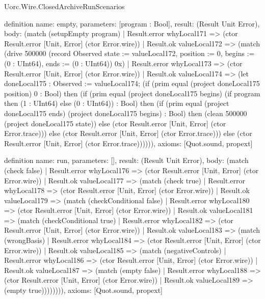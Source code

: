 \begin{lexlean}{Uorc.Wire.ClosedArchiveRunScenarios}
\begin{semanticmodule}
definition{
  name: empty,
  parameters: [program : Bool],
  result: (Result Unit Error),
  body: (match (setupEmpty program)
    | Result.error whyLocal171 => (ctor Result.error [Unit, Error] (ctor Error.wire))
    | Result.ok valueLocal172 => (match (drive 500000 (record Observed {state := valueLocal172, position := 0, begins := (0 : UInt64), ends := (0 : UInt64)}) 0x)
      | Result.error whyLocal173 => (ctor Result.error [Unit, Error] (ctor Error.wire))
      | Result.ok valueLocal174 => (let doneLocal175 : Observed := valueLocal174; (if (prim equal (project doneLocal175 position) 0 : Bool) then (if (prim equal (project doneLocal175 begins) (if program then (1 : UInt64) else (0 : UInt64)) : Bool) then (if (prim equal (project doneLocal175 ends) (project doneLocal175 begins) : Bool) then (clean 500000 (project doneLocal175 state)) else (ctor Result.error [Unit, Error] (ctor Error.trace))) else (ctor Result.error [Unit, Error] (ctor Error.trace))) else (ctor Result.error [Unit, Error] (ctor Error.trace)))))),
  axioms: [Quot.sound, propext]
}

definition{
  name: run,
  parameters: [],
  result: (Result Unit Error),
  body: (match (check false)
    | Result.error whyLocal176 => (ctor Result.error [Unit, Error] (ctor Error.wire))
    | Result.ok valueLocal177 => (match (check true)
      | Result.error whyLocal178 => (ctor Result.error [Unit, Error] (ctor Error.wire))
      | Result.ok valueLocal179 => (match (checkConditional false)
        | Result.error whyLocal180 => (ctor Result.error [Unit, Error] (ctor Error.wire))
        | Result.ok valueLocal181 => (match (checkConditional true)
          | Result.error whyLocal182 => (ctor Result.error [Unit, Error] (ctor Error.wire))
          | Result.ok valueLocal183 => (match (wrongBasis)
            | Result.error whyLocal184 => (ctor Result.error [Unit, Error] (ctor Error.wire))
            | Result.ok valueLocal185 => (match (negativeControls)
              | Result.error whyLocal186 => (ctor Result.error [Unit, Error] (ctor Error.wire))
              | Result.ok valueLocal187 => (match (empty false)
                | Result.error whyLocal188 => (ctor Result.error [Unit, Error] (ctor Error.wire))
                | Result.ok valueLocal189 => (empty true)))))))),
  axioms: [Quot.sound, propext]
}
\end{semanticmodule}
\end{lexlean}
